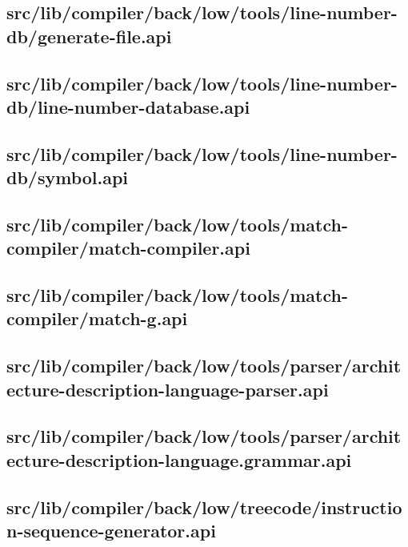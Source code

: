 \subsection{src/lib/compiler/back/low/tools/line-number-db/generate-file.api}


\subsection{src/lib/compiler/back/low/tools/line-number-db/line-number-database.api}


\subsection{src/lib/compiler/back/low/tools/line-number-db/symbol.api}


\subsection{src/lib/compiler/back/low/tools/match-compiler/match-compiler.api}


\subsection{src/lib/compiler/back/low/tools/match-compiler/match-g.api}


\subsection{src/lib/compiler/back/low/tools/parser/architecture-description-language-parser.api}


\subsection{src/lib/compiler/back/low/tools/parser/architecture-description-language.grammar.api}


\subsection{src/lib/compiler/back/low/treecode/instruction-sequence-generator.api}


